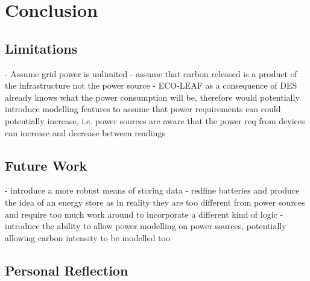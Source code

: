 \documentclass{l4proj}
\begin{document}


\chapter{Conclusion}

\section{Limitations}
- Assume grid power is unlimited
- assume that carbon released is a product of the infrastructure not the power source
- ECO-LEAF as a consequence of DES already knows what the power consumption will be, therefore would potentially introduce modelling features to assume that power requirements can could potentially increase, i.e. power sources are aware that the power req from devices can increase and decrease between readings

\section{Future Work}\label{conc:sec:Future Work}
- introduce a more robust means of storing data
- redfine batteries and produce the idea of an energy store as in reality they are too different from power sources and require too much work around to incorporate a different kind of logic
- introduce the ability to allow power modelling on power sources, potentially allowing carbon intensity to be modelled too
\section{Personal Reflection}\label{conc:sec:Personal Reflection}
\end{document}
